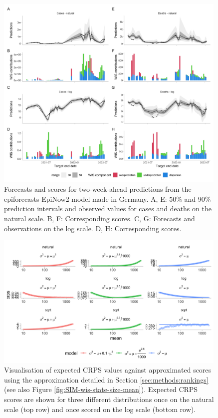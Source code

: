 \documentclass{article}
\begin{document}
\begin{figure}[h!]
    \centering
    \includegraphics[width=0.99\textwidth]{output/figures/HUB-model-comparison-epinow.png}
    \caption{
    Forecasts and scores for two-week-ahead predictions from the epiforecasts-EpiNow2 model made in Germany. A, E: 50\% and 90\% prediction intervals and observed values for cases and deaths on the natural scale. B, F: Corresponding scores. C, G: Forecasts and observations on the log scale. D, H: Corresponding scores. 
    }
    \label{fig:HUB-model-comparison-epinow}
\end{figure}


\begin{figure}[h!]
    \centering
    \includegraphics[width=0.99\textwidth]{output/figures/SIM-score-approximation.png}
    \caption{
    Visualisation of expected CRPS values against approximated scores using the approximation detailed in Section \ref{sec:methods:rankings} (see also Figure \ref{fig:SIM-wis-state-size-mean}). Expected CRPS scores are shown for three different distributions once on the natural scale (top row) and once scored on the log scale (bottom row).  
    }
    \label{fig:HUB-model-comparison-epinow}
\end{figure}
\end{document}
